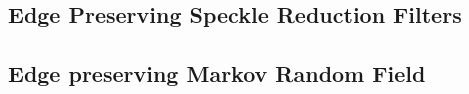 










\subsection{Edge Preserving Speckle Reduction Filters}
\label{sec:SpeckleFilters}
\ifitkFullVersion


\fi



\subsection{Edge preserving Markov Random Field}


